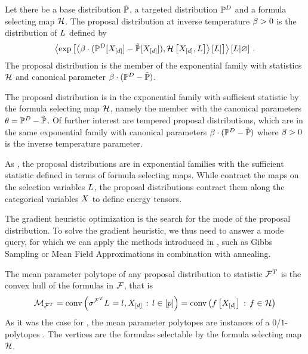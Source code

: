 \begin{definition}
    Let there be a base distribution $\tilde{\mathbb{P}}$, a targeted distribution $\mathbb{P}^{D}$ and a formula selecting map $\mathcal{H}$.
    The proposal distribution at inverse temperature $\beta>0$ is the distribution of $L$ defined by
    \begin{align*}
        \left\langle \mathrm{exp}\left[\left\langle \beta\cdot(\mathbb{P}^{D}[X_{[d]}]-\tilde{\mathbb{P}}[X_{[d]}]),\mathcal{H}\left[X_{[d]},L\right]\right\rangle \left[ L \right]\right] \right\rangle \left[ L | \varnothing \right] \, .
    \end{align*}
    The proposal distribution is the member of the exponential family with statistics $\mathcal{H}$ and canonical parameter $\beta\cdot(\mathbb{P}^{D}-\tilde{\mathbb{P}})$.
\end{definition}


The proposal distribution is in the exponential family with sufficient statistic by the formula selecting map $\mathcal{H}$, namely the member with the canonical parameters $\theta=\mathbb{P}^{D}-\tilde{\mathbb{P}}$.
Of further interest are tempered proposal distributions, which are in the same exponential family with canonical parameters $\beta\cdot(\mathbb{P}^{D}-\tilde{\mathbb{P}})$ where $\beta>0$ is the inverse temperature parameter.

As \MarkovLogicNetworks{}, the proposal distributions are in exponential families with the sufficient statistic defined in terms of formula selecting maps.
While \MarkovLogicNetworks{} contract the maps on the selection variables $L$, the proposal distributions contract them along the categorical variables $X$ to define energy tensors.

The gradient heuristic optimization  is the search for the mode of the proposal distribution.
To solve the gradient heuristic, we thus need to answer a mode query, for which we can apply the methods introduced in , such as Gibbs Sampling or Mean Field Approximations in combination with annealing.


The mean parameter polytope of any proposal distribution to statistic $\mathcal{F}^T$ is the convex hull of the formulas in $\mathcal{F}$, that is
\begin{align*}
    \mathcal{M}_{\mathcal{F}^T}
    = \mathrm{conv}\left(\sigma^{\mathcal{F}^T}{L_{}=l_{},X_{[d]}} \,:\, l\in[p]\right)
    = \mathrm{conv}\left(f\left[X_{[d]}\right] \,:\, f\in\mathcal{H}\right)
\end{align*}
As it was the case for \MarkovLogicNetworks{}, the mean parameter polytopes are instances of a $0/1$-polytopes \cite{ziegler_lectures_2000,gillmann_01-polytopes_2007}.
The vertices are the formulas selectable by the formula selecting map $\mathcal{H}$.

